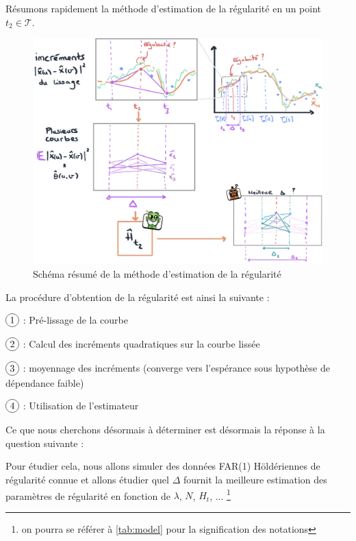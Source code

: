 Résumons rapidement la méthode d'estimation de la régularité en un point $t_2 \in \mathcal T$.

\begin{figure}[H]
	\begin{center}
		\includegraphics[width=\textwidth]{Images/sketches/estim_reg.jpg}
	\end{center}

	\caption{Schéma résumé de la méthode d'estimation de la régularité}
	\label{fig:sketch_estim_reg_methodo}
\end{figure}

\noindent La procédure d'obtention de la régularité est ainsi la suivante :

$\circled 1$ : Pré-lissage de la courbe

$\circled 2$ : Calcul des incréments quadratiques sur la courbe lissée

$\circled 3$ : moyennage des incréments (converge vers l'espérance sous hypothèse de dépendance faible)

$\circled 4$ : Utilisation de l'estimateur

Ce que nous cherchons désormais à déterminer est désormais la réponse à la question suivante :


Pour étudier cela, nous allons simuler des données FAR(1) Höldériennes de régularité connue et allons étudier quel $\Delta$ fournit la meilleure estimation des paramètres de régularité en fonction de $\lambda$, $N$, $H_t$, ... \footnote{on pourra se référer à \ref{tab:model} pour la signification des notations}
